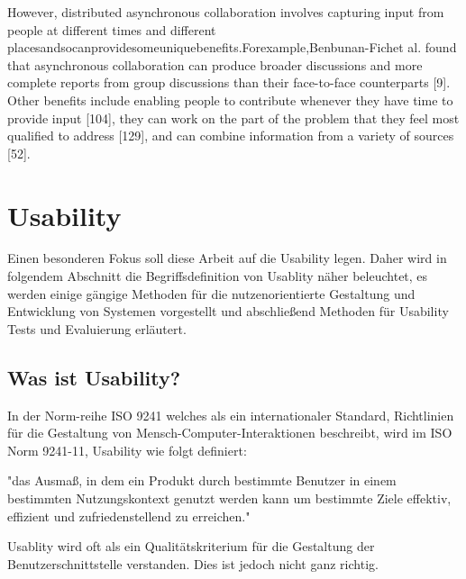
However, distributed asynchronous collaboration involves capturing input from people at different times and different placesandsocanprovidesomeuniquebenefits.Forexample,Benbunan-Fichet al. found that asynchronous collaboration can produce broader discussions and more complete reports from group discussions than their face-to-face counterparts [9]. Other benefits include enabling people to contribute whenever they have time to provide input [104], they can work on the part of the problem that they feel most qualified to address [129], and can combine information from a variety of sources [52].


\section{Usability}

Einen besonderen Fokus soll diese Arbeit auf die Usability legen. Daher wird in folgendem Abschnitt die Begriffsdefinition von Usablity näher beleuchtet, es werden einige 
gängige Methoden für die nutzenorientierte Gestaltung und Entwicklung von Systemen vorgestellt und abschließend Methoden für Usability Tests und Evaluierung erläutert. 

\subsection{Was ist Usability?}

In der Norm-reihe ISO 9241 welches als ein internationaler Standard, Richtlinien für die Gestaltung von Mensch-Computer-Interaktionen beschreibt, wird im ISO Norm 9241-11,  Usability wie folgt definiert:

"das Ausmaß, in dem ein Produkt durch bestimmte Benutzer in einem bestimmten Nutzungskontext genutzt werden kann um bestimmte Ziele effektiv, effizient und zufriedenstellend zu erreichen."

\cite{MichaelRichter2016; MaryBethRossonJohnM.CarrollDianeD.Cerra2002} Usablity wird  oft als ein Qualitätskriterium für die Gestaltung der Benutzerschnittstelle verstanden. Dies ist jedoch nicht ganz richtig.

